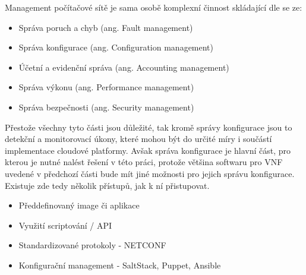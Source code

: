 Management počítačové sítě je sama osobě komplexní činnost skládající dle \cite{network_management} se ze:

\begin{itemize}
\item Správa poruch a chyb (ang. Fault management)
\item Správa konfigurace (ang. Configuration management)
\item Účetní a evidenční správa (ang. Accounting management)
\item Správa výkonu (ang. Performance management) 
\item Správa bezpečnosti (ang. Security management)
\end{itemize}

Přestože všechny tyto části jsou důležité, tak kromě správy konfigurace jsou to detekční a monitorovací úkony, které mohou být do určité míry i součástí implementace cloudové platformy. Avšak správa konfigurace je hlavní část, pro kterou je nutné nalést řešení v této práci, protože většina softwaru pro VNF uvedené v předchozí části bude mít jiné možnosti pro jejich správu konfigurace. Existuje zde tedy několik přístupů, jak k ní přistupovat.

\begin{itemize}
\item Předdefinovaný image či aplikace
\item Využití scriptování / API 
\item Standardizované protokoly - NETCONF
\item Konfigurační management - SaltStack, Puppet, Ansible
\end{itemize}





